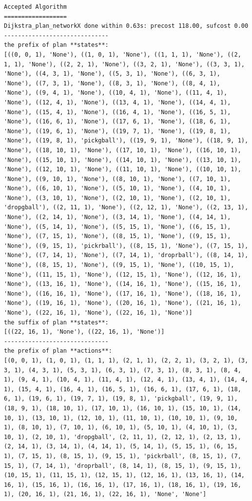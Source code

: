 \begin{lstlisting}
Accepted Algorithm
==================
Dijkstra_plan_networkX done within 0.63s: precost 118.00, sufcost 0.00
------------------------------
the prefix of plan **states**:
[((0, 0, 1), 'None'), ((1, 0, 1), 'None'), ((1, 1, 1), 'None'), ((2, 1, 1), 'None'), ((2, 2, 1), 'None'), ((3, 2, 1), 'None'), ((3, 3, 1), 'None'), ((4, 3, 1), 'None'), ((5, 3, 1), 'None'), ((6, 3, 1), 'None'), ((7, 3, 1), 'None'), ((8, 3, 1), 'None'), ((8, 4, 1), 'None'), ((9, 4, 1), 'None'), ((10, 4, 1), 'None'), ((11, 4, 1), 'None'), ((12, 4, 1), 'None'), ((13, 4, 1), 'None'), ((14, 4, 1), 'None'), ((15, 4, 1), 'None'), ((16, 4, 1), 'None'), ((16, 5, 1), 'None'), ((16, 6, 1), 'None'), ((17, 6, 1), 'None'), ((18, 6, 1), 'None'), ((19, 6, 1), 'None'), ((19, 7, 1), 'None'), ((19, 8, 1), 'None'), ((19, 8, 1), 'pickgball'), ((19, 9, 1), 'None'), ((18, 9, 1), 'None'), ((18, 10, 1), 'None'), ((17, 10, 1), 'None'), ((16, 10, 1), 'None'), ((15, 10, 1), 'None'), ((14, 10, 1), 'None'), ((13, 10, 1), 'None'), ((12, 10, 1), 'None'), ((11, 10, 1), 'None'), ((10, 10, 1), 'None'), ((9, 10, 1), 'None'), ((8, 10, 1), 'None'), ((7, 10, 1), 'None'), ((6, 10, 1), 'None'), ((5, 10, 1), 'None'), ((4, 10, 1), 'None'), ((3, 10, 1), 'None'), ((2, 10, 1), 'None'), ((2, 10, 1), 'dropgball'), ((2, 11, 1), 'None'), ((2, 12, 1), 'None'), ((2, 13, 1), 'None'), ((2, 14, 1), 'None'), ((3, 14, 1), 'None'), ((4, 14, 1), 'None'), ((5, 14, 1), 'None'), ((5, 15, 1), 'None'), ((6, 15, 1), 'None'), ((7, 15, 1), 'None'), ((8, 15, 1), 'None'), ((9, 15, 1), 'None'), ((9, 15, 1), 'pickrball'), ((8, 15, 1), 'None'), ((7, 15, 1), 'None'), ((7, 14, 1), 'None'), ((7, 14, 1), 'droprball'), ((8, 14, 1), 'None'), ((8, 15, 1), 'None'), ((9, 15, 1), 'None'), ((10, 15, 1), 'None'), ((11, 15, 1), 'None'), ((12, 15, 1), 'None'), ((12, 16, 1), 'None'), ((13, 16, 1), 'None'), ((14, 16, 1), 'None'), ((15, 16, 1), 'None'), ((16, 16, 1), 'None'), ((17, 16, 1), 'None'), ((18, 16, 1), 'None'), ((19, 16, 1), 'None'), ((20, 16, 1), 'None'), ((21, 16, 1), 'None'), ((22, 16, 1), 'None'), ((22, 16, 1), 'None')]
the suffix of plan **states**:
[((22, 16, 1), 'None'), ((22, 16, 1), 'None')]
------------------------------
the prefix of plan **actions**:
[(0, 0, 1), (1, 0, 1), (1, 1, 1), (2, 1, 1), (2, 2, 1), (3, 2, 1), (3, 3, 1), (4, 3, 1), (5, 3, 1), (6, 3, 1), (7, 3, 1), (8, 3, 1), (8, 4, 1), (9, 4, 1), (10, 4, 1), (11, 4, 1), (12, 4, 1), (13, 4, 1), (14, 4, 1), (15, 4, 1), (16, 4, 1), (16, 5, 1), (16, 6, 1), (17, 6, 1), (18, 6, 1), (19, 6, 1), (19, 7, 1), (19, 8, 1), 'pickgball', (19, 9, 1), (18, 9, 1), (18, 10, 1), (17, 10, 1), (16, 10, 1), (15, 10, 1), (14, 10, 1), (13, 10, 1), (12, 10, 1), (11, 10, 1), (10, 10, 1), (9, 10, 1), (8, 10, 1), (7, 10, 1), (6, 10, 1), (5, 10, 1), (4, 10, 1), (3, 10, 1), (2, 10, 1), 'dropgball', (2, 11, 1), (2, 12, 1), (2, 13, 1), (2, 14, 1), (3, 14, 1), (4, 14, 1), (5, 14, 1), (5, 15, 1), (6, 15, 1), (7, 15, 1), (8, 15, 1), (9, 15, 1), 'pickrball', (8, 15, 1), (7, 15, 1), (7, 14, 1), 'droprball', (8, 14, 1), (8, 15, 1), (9, 15, 1), (10, 15, 1), (11, 15, 1), (12, 15, 1), (12, 16, 1), (13, 16, 1), (14, 16, 1), (15, 16, 1), (16, 16, 1), (17, 16, 1), (18, 16, 1), (19, 16, 1), (20, 16, 1), (21, 16, 1), (22, 16, 1), 'None', 'None']

\end{lstlisting}

